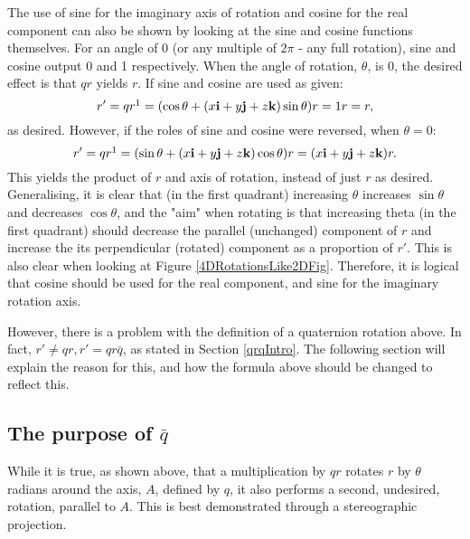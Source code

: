 \documentclass[10pt]{article}
\begin{document}
The use of sine for the imaginary axis of rotation and cosine for the real component can also be shown by looking at the sine and cosine functions themselves. For an angle of 0 (or any multiple of $2\pi$ - any full rotation), sine and cosine output 0 and 1 respectively. When the angle of rotation, $\theta$, is 0, the desired effect is that $qr$ yields $r$. If sine and cosine are used as given:
\begin{equation}
    r' = qr\footnotemark[1] = (\cos\theta + (x\vb{i} + y\vb{j} + z\vb{k})\sin\theta)r = 1r = r,
\end{equation}
as desired. However, if the roles of sine and cosine were reversed, when $\theta = 0$:
\begin{equation}
    r' = qr\footnotemark[1] = (\sin\theta + (x\vb{i} + y\vb{j} + z\vb{k})\cos\theta)r = (x\vb{i} + y\vb{j} + z\vb{k})r.
\end{equation}
This yields the product of $r$ and axis of rotation, instead of just $r$ as desired. Generalising, it is clear that (in the first quadrant) increasing $\theta$ increases $\sin\theta$ and decreases $\cos\theta$, and the "aim" when rotating is that increasing theta (in the first quadrant) should decrease the parallel (unchanged) component of $r$ and increase the its perpendicular (rotated) component as a proportion of $r'$. This is also clear when looking at Figure \ref{4DRotationsLike2DFig}. Therefore, it is logical that cosine should be used for the real component, and sine for the imaginary rotation axis.

However, there is a problem with the definition of a quaternion rotation above. In fact, $r' \neq qr, r' = qr\bar{q}$, as stated in Section \ref{qrqIntro}. The following section will explain the reason for this, and how the formula above should be changed to reflect this.

\subsection{The purpose of $\bar{q}$} \label{QBarSection}

While it is true, as shown above, that a multiplication by $qr$ rotates $r$ by $\theta$ radians around the axis, $A$, defined by $q$, it also performs a second, undesired, rotation, parallel to $A$. This is best demonstrated through a stereographic projection. \cite{Penguin} \cite{3Blue1Brown}
\end{document}
